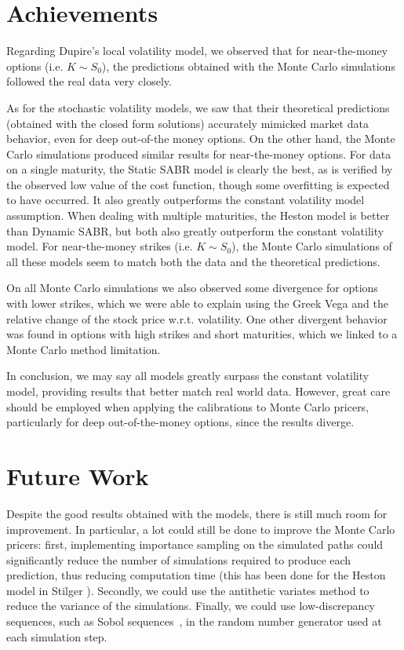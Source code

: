\section{Achievements}
Regarding Dupire's local volatility model, we observed that for near-the-money options  (i.e. $K\sim S_0$), the predictions obtained with the Monte Carlo simulations followed the real data very closely.

As for the stochastic volatility models, we saw that their theoretical predictions (obtained with the closed form solutions) accurately mimicked market data behavior, even for deep out-of-the money options. On the other hand, the Monte Carlo simulations produced similar results for near-the-money options.
For data on a single maturity, the Static SABR model is clearly the best, as is verified by the observed low value of the cost function, though some overfitting is expected to have occurred. It also greatly outperforms the constant volatility model assumption. When dealing with multiple maturities, the Heston model is better than Dynamic SABR, but both also greatly outperform the constant volatility model.
For near-the-money strikes (i.e. $K\sim S_0$), the Monte Carlo simulations of all these models seem to match both the data and the theoretical predictions.


On all Monte Carlo simulations we also observed some divergence for options with lower strikes, which we were able to explain using the Greek Vega and the relative change of the stock price w.r.t. volatility. One other divergent behavior was found in options with high strikes and short maturities, which we linked to a Monte Carlo method limitation.

In conclusion, we may say all models greatly surpass the constant volatility model, providing results that better match real world data. However, great care should be employed when applying the calibrations to Monte Carlo pricers, particularly for deep out-of-the-money options, since the results diverge.


\section{Future Work}
Despite the good results obtained with the models, there is still much room for improvement. In particular, a lot could still be done to improve the Monte Carlo pricers:  first, implementing importance sampling on the simulated paths could significantly reduce the number of simulations required to produce each prediction, thus reducing computation time (this has been done for the Heston model in Stilger \citep{Stilger}). Secondly, we could use the antithetic variates method to reduce the variance of the simulations. Finally, we could use low-discrepancy sequences, such as Sobol sequences~\citep{Sobol2}, in the random number generator used at each simulation step.

